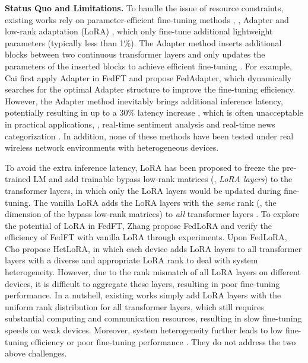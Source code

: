 \textbf{Status Quo and Limitations.} 
To handle the issue of resource constraints, existing works rely on parameter-efficient fine-tuning methods \cite{zhang2023fedpetuning}, \eg, Adapter \cite{houlsby2019parameter} and low-rank adaptation (LoRA) \cite{hu2021lora}, which only fine-tune additional lightweight parameters (typically less than 1\%). 
The Adapter method inserts additional blocks between two continuous transformer layers and only updates the parameters of the inserted blocks to achieve efficient fine-tuning \cite{houlsby2019parameter}.
For example, Cai \etal \cite{cai2022fedadapter} first apply Adapter in FedFT and propose FedAdapter, which dynamically searches for the optimal Adapter structure to improve the fine-tuning efficiency.
However, the Adapter method inevitably brings additional inference latency, potentially resulting in up to a 30\% latency increase \cite{hu2021lora, liao2023parameter, li2024caraserve}, which is often unacceptable in practical applications, \eg, real-time sentiment analysis \cite{wankhade2022survey} and real-time news categorization \cite{minaee2021deep}. 
In addition, none of these methods have been tested under real wireless network environments with heterogeneous devices. 


To avoid the extra inference latency, LoRA \cite{hu2021lora} has been proposed to freeze the pre-trained LM and add trainable bypass low-rank matrices (\ie, \textit{LoRA layers}) to the transformer layers, in which only the LoRA layers would be updated during fine-tuning.
The vanilla LoRA adds the LoRA layers with the \textit{same} rank (\ie, the dimension of the bypass low-rank matrices) to \textit{all} transformer layers \cite{zhang2022adaptive}.
To explore the potential of LoRA in FedFT, Zhang \etal \cite{zhang2023fedpetuning} propose FedLoRA and verify the efficiency of FedFT with vanilla LoRA through experiments.
Upon FedLoRA, Cho \etal \cite{cho2023heterogeneous} propose HetLoRA, in which each device adds LoRA layers to all transformer layers with a diverse and appropriate LoRA rank to deal with system heterogeneity.
However, due to the rank mismatch of all LoRA layers on different devices, it is difficult to aggregate these layers, resulting in poor fine-tuning performance.
In a nutshell, existing works simply add LoRA layers with the uniform rank distribution for all transformer layers, which still requires substantial computing and communication resources, resulting in slow fine-tuning speeds on weak devices.
Moreover, system heterogeneity further leads to low fine-tuning efficiency or poor fine-tuning performance \cite{kim2021autofl, luo2022tackling, liao2024mergesfl}. 
They do not address the two above challenges. 


